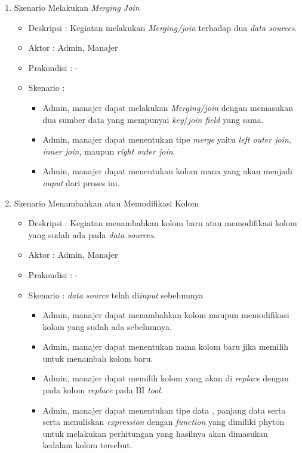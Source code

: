\begin{enumerate}
		\item Skenario Melakukan \textit{Merging Join}
		{\renewcommand\labelitemi{}
	\begin{itemize}
			\item Deskripsi		: Kegiatan melakukan \textit{Merging/join} terhadap dua \textit{data sources}.
			\item Aktor				: Admin, Manajer 
			\item Prakondisi	: -
			\item Skenario		:
				\begin{itemize}
					\item Admin, manajer dapat melakukan \textit{Merging/join} dengan memasukan dua sumber data yang mempunyai \textit{key}/\textit{join field} yang sama.
					\item Admin, manajer dapat menentukan tipe \textit{merge} yaitu \textit{left outer join, inner join, } maupun \textit{right outer join}.
					\item Admin, manajer dapat menentukan kolom mana yang akan menjadi \textit{ouput} dari proses ini.
				\end{itemize}
		\end{itemize}
		}
		
		\item Skenario Menambahkan atau Memodifikasi Kolom
		{\renewcommand\labelitemi{}
		\begin{itemize}
			\item Deskripsi		: Kegiatan menambahkan kolom baru atau memodifikasi kolom yang sudah ada pada \textit{data sources}.
			\item Aktor				: Admin, Manajer 
			\item Prakondisi	: -
			\item Skenario		: \textit{data source} telah di\textit{input} sebelumnya
				\begin{itemize}
					\item Admin, manajer dapat menambahkan kolom maupun memodifikasi kolom yang sudah ada sebelumnya.
					\item Admin, manajer dapat menentukan nama kolom baru jika memilih untuk menambah kolom baru.
					\item Admin, manajer dapat memilih kolom yang akan di \textit{replace} dengan pada kolom \textit{replace} pada BI \textit{tool}.
					\item Admin, manajer dapat menentukan tipe data , panjang data serta serta menuliskan \textit{expression} dengan \textit{function} yang dimiliki phyton untuk melakukan perhitungan yang hasilnya akan dimasukan kedalam kolom tersebut.
				\end{itemize}
		\end{itemize}
		}
		

\end{enumerate}
